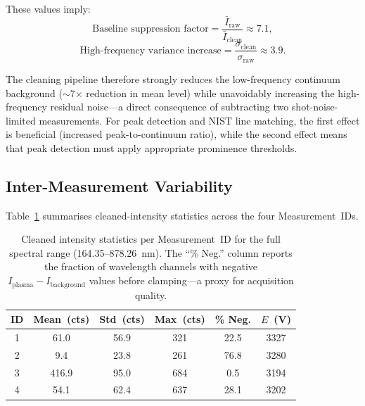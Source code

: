 \documentclass[a4paper,twocolumn,10pt]{article}
\begin{document}
These values imply:
\begin{equation}
\text{Baseline suppression factor} =
  \frac{\bar{I}_{\text{raw}}}{\bar{I}_{\text{clean}}} \approx 7.1,
\end{equation}
\begin{equation}
\text{High-frequency variance increase} =
  \frac{\sigma_{\text{clean}}}{\sigma_{\text{raw}}} \approx 3.9.
\end{equation}

The cleaning pipeline therefore strongly reduces the low-frequency
continuum background ($\sim$7$\times$ reduction in mean level) while
unavoidably increasing the high-frequency residual noise---a direct
consequence of subtracting two shot-noise-limited measurements.
For peak detection and NIST line matching, the first effect is
beneficial (increased peak-to-continuum ratio), while the second
effect means that peak detection must apply appropriate prominence
thresholds.

\subsection{Inter-Measurement Variability}

Table~\ref{tab:measurement_stats} summarises cleaned-intensity
statistics across the four Measurement~IDs.

\begin{table}[!t]
\centering
\caption{Cleaned intensity statistics per Measurement~ID for the
  full spectral range (164.35--878.26~nm).  The ``\% Neg.'' column
  reports the fraction of wavelength channels with negative
  $I_{\text{plasma}} - I_{\text{background}}$ values before
  clamping---a proxy for acquisition quality.}
\label{tab:measurement_stats}
{\small
\begin{tabularx}{\textwidth}{@{}cccccc@{}}
\toprule
\textbf{ID} & \textbf{Mean~(cts)} & \textbf{Std~(cts)} &
  \textbf{Max~(cts)} & \textbf{\% Neg.} & \textbf{$E$~(V)} \\
\midrule
1 & 61.0  & 56.9  & 321  & 22.5 & 3327 \\
2 & 9.4   & 23.8  & 261  & 76.8 & 3280 \\
3 & 416.9 & 95.0  & 684  & 0.5  & 3194 \\
4 & 54.1  & 62.4  & 637  & 28.1 & 3202 \\
\bottomrule
\end{tabularx}
}
\end{table}
\end{document}
